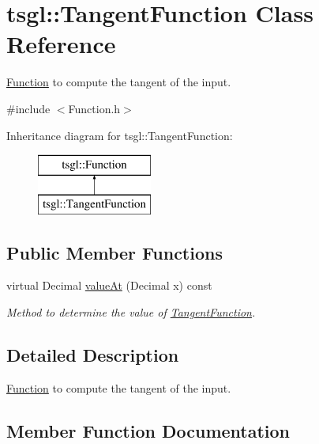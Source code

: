 \hypertarget{classtsgl_1_1_tangent_function}{}\section{tsgl\+:\+:Tangent\+Function Class Reference}
\label{classtsgl_1_1_tangent_function}


\hyperlink{classtsgl_1_1_function}{Function} to compute the tangent of the input.  




{\ttfamily \#include $<$Function.\+h$>$}

Inheritance diagram for tsgl\+:\+:Tangent\+Function\+:\begin{figure}[H]
\begin{center}
\leavevmode
\includegraphics[height=2.000000cm]{classtsgl_1_1_tangent_function}
\end{center}
\end{figure}
\subsection*{Public Member Functions}
\begin{DoxyCompactItemize}
\item 
virtual Decimal \hyperlink{classtsgl_1_1_tangent_function_af0ca18ffd1bccefb8ede5c1121e3813c}{value\+At} (Decimal x) const
\begin{DoxyCompactList}\small\item\em Method to determine the value of \hyperlink{classtsgl_1_1_tangent_function}{Tangent\+Function}. \end{DoxyCompactList}\end{DoxyCompactItemize}


\subsection{Detailed Description}
\hyperlink{classtsgl_1_1_function}{Function} to compute the tangent of the input. 

\subsection{Member Function Documentation}
\mbox{\label{classtsgl_1_1_tangent_function_af0ca18ffd1bccefb8ede5c1121e3813c}} 
